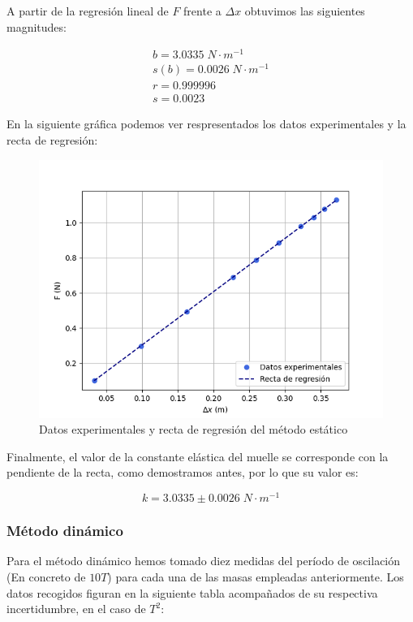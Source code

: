 \documentclass[a4paper,12pt,titlepage]{article}
\begin{document}
A partir de la regresión lineal de $F$ frente a $\Delta x$ obtuvimos las siguientes magnitudes:

\begin{equation}
    \begin{gathered}
        b =  3.0335 \; N \cdot m^{-1} \\
        s(b) = 0.0026 \; N \cdot m^{-1} \\
        r =  0.999996 \\
        s =  0.0023
    \end{gathered}
\end{equation}

En la siguiente gráfica podemos ver respresentados los datos experimentales y la recta de regresión:

\newpage

\begin{figure}[h!]
    \centering
    \includegraphics[width=0.75\linewidth]{Images/RegEstatico.png}
    \caption{Datos experimentales y recta de regresión del método estático}
\end{figure}

Finalmente, el valor de la constante elástica del muelle se corresponde con la pendiente de la recta, como demostramos antes, por lo que su valor es:

\begin{equation}
    k = 3.0335 \pm 0.0026 \; N \cdot m^{-1}
\end{equation}

\subsubsection{Método dinámico}

Para el método dinámico hemos tomado diez medidas del período de oscilación (En concreto de $10T$) para cada una de las masas empleadas anteriormente. Los datos recogidos figuran en la siguiente tabla acompañados de su respectiva incertidumbre, en el caso de $T^2$:
\end{document}
